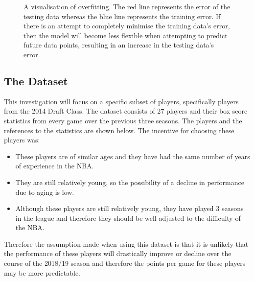 \documentclass[a4paper,11pt,twoside]{article}
\begin{document}
      \begin{figure}[!htb]
      \captionsetup{justification=centering}
        \caption{\label{fig:my-label} A visualisation of overfitting. The red line represents the error of the testing data whereas the blue line represents the training error. If there is an attempt to completely minimise the training data's error, then the model will become less flexible when attempting to predict future data points, resulting in an increase in the testing data's error. }
      \end{figure}



\subsection{The Dataset}
This investigation will focus on a specific subset of players, specifically players from the 2014 Draft Class. The dataset consists of 27 players and their box score statistics from every game over the previous three seasons. The players and the references to the statistics are shown below. The incentive for choosing these players was:
\begin{itemize}
    \item These players are of similar ages and they have had the same number of years of experience in the NBA.
    \item They are still relatively young, so the possibility of a decline in performance due to aging is low.
    \item Although these players are still relatively young, they have played 3 seasons in the league and therefore they should be well adjusted to the difficulty of the NBA.
\end{itemize}
Therefore the assumption made when using this dataset is that it is unlikely that the performance of these players will drastically improve or decline over the course of the 2018/19 season and therefore the points per game for these players may be more predictable.
\end{document}

